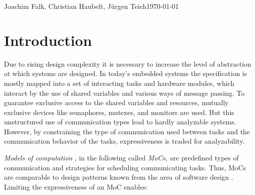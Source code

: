 \newcommand{\graphicPostfix}{pdf}
\newcommand{\resdir}{../../../HscdTeXRes/}
\newcommand{\code}[1]{\emph{#1}}
\newcommand{\SysteMoC}{\emph{SysteMoC}}
\newcommand{\SysteMoCV}{\emph{SysteMoC 1.0}}



\usepackage{multirow}
\usepackage{fancyvrb}

\makeatletter  %
\renewcommand{\verbatim@font}{%
  \ttfamily\small\catcode`\<=\active\catcode`\>=\active%
}
\makeatother   %




{Joachim Falk, Christian Haubelt, J\"urgen Teich}{\today}
\clearpage
\tableofcontents
\clearpage

\section{Introduction\label{intro}}
Due to rising design complexity it is necessary to increase
the level of abstraction at which systems are designed. In
today's embedded systems the specification is mostly mapped
into a set of interacting tasks and hardware modules, which 
interact by the use of shared variables and various ways of
message passing. To guarantee exclusive access to the shared
variables and resources, mutually exclusive devices like semaphores,
mutexes, and monitors are used. But this unstructured use
of communication types lead to hardly analyzable systems.
However, by constraining the type of communication
used between tasks and the communication behavior of the tasks,
expressiveness is traded for analyzability.

\emph{Models of computation}
\cite{embsft:2002}, in the following called \emph{MoCs}, are
predefined types of communication and strategies for scheduling
communicating tasks. Thus, MoCs are comparable to design
patterns known from the area of software design \cite{gamma:1995}.
Limiting the expressiveness of an MoC enables:

